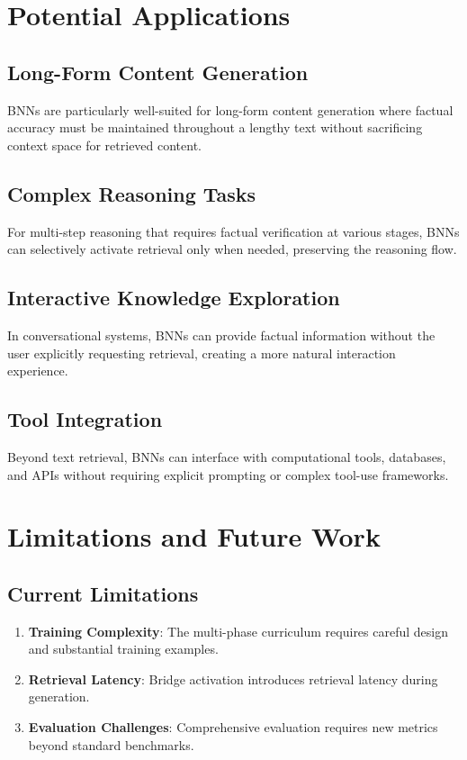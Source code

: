 \documentclass[9pt,a4paper,twocolumn,twoside]{tau-class/tau}
\begin{document}
\section{Potential Applications}

\subsection{Long-Form Content Generation}

    BNNs are particularly well-suited for long-form content generation where factual accuracy must be maintained throughout a lengthy text without sacrificing context space for retrieved content.

\subsection{Complex Reasoning Tasks}

    For multi-step reasoning that requires factual verification at various stages, BNNs can selectively activate retrieval only when needed, preserving the reasoning flow.

\subsection{Interactive Knowledge Exploration}

    In conversational systems, BNNs can provide factual information without the user explicitly requesting retrieval, creating a more natural interaction experience.

\subsection{Tool Integration}

    Beyond text retrieval, BNNs can interface with computational tools, databases, and APIs without requiring explicit prompting or complex tool-use frameworks.

\section{Limitations and Future Work}

\subsection{Current Limitations}

    \begin{enumerate}
        \item \textbf{Training Complexity}: The multi-phase curriculum requires careful design and substantial training examples.
        \item \textbf{Retrieval Latency}: Bridge activation introduces retrieval latency during generation.
        \item \textbf{Evaluation Challenges}: Comprehensive evaluation requires new metrics beyond standard benchmarks.
    \end{enumerate}
\end{document}
